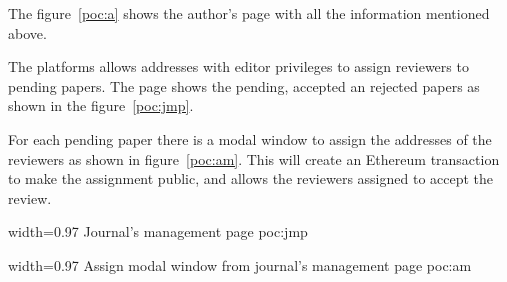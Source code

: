 The figure~\ref{poc:a} shows the author's page with all the information
mentioned above.


The platforms allows addresses with editor privileges to assign reviewers to
pending papers. The page shows the pending, accepted an rejected papers as shown
in the figure~\ref{poc:jmp}.

For each pending paper there is a modal window to assign the addresses of the reviewers
as shown in figure~\ref{poc:am}. This will create an Ethereum transaction to
make the assignment public, and allows the reviewers assigned to accept the
review.

%
{width=0.97\linewidth}%
{Journal's management page}%
{poc:jmp}

%
{width=0.97\linewidth}%
{Assign modal window from journal's management page}%
{poc:am}


